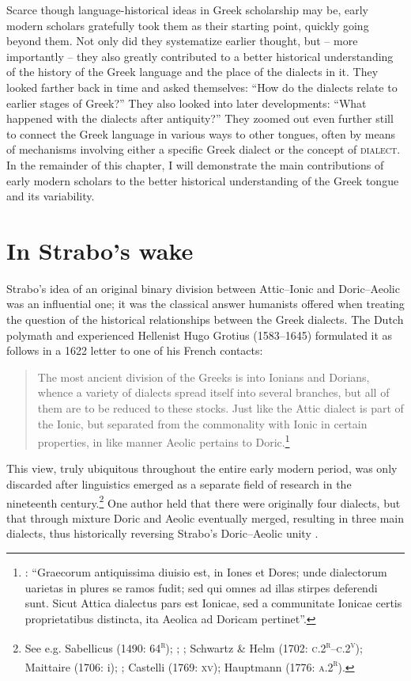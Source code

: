 Scarce though language-historical ideas in Greek scholarship may be, early modern scholars gratefully took them as their starting point, quickly going beyond them. Not only did they systematize earlier thought, but – more importantly – they also greatly contributed to a better historical understanding of the history of the Greek language and the place of the dialects in it. They looked farther back in time and asked themselves: “How do the dialects relate to earlier stages of Greek?” They also looked into later developments: “What happened with the dialects after antiquity?” They zoomed out even further still to connect the Greek language in various ways to other tongues, often by means of mechanisms involving either a specific Greek dialect or the concept of \textsc{dialect}. In the remainder of this chapter, I will demonstrate the main contributions of early modern scholars to the better historical understanding of the Greek tongue and its variability.

\section{In Strabo’s wake}

Strabo’s idea of an original binary division between Attic–Ionic and Doric–Aeolic was an influential one; it was the classical answer humanists offered when treating the question of the historical relationships between the Greek dialects. The Dutch polymath and experienced Hellenist Hugo Grotius (1583–1645) formulated it as follows in a 1622 letter to one of his French contacts:

\begin{quote}
The most ancient division of the Greeks is into Ionians and Dorians, whence a variety of dialects spread itself into several branches, but all of them are to be reduced to these stocks. Just like the Attic dialect is part of the Ionic, but separated from the commonality with Ionic in certain properties, in like manner Aeolic pertains to Doric.\footnote{\citet[143]{Grotius1648}: “Graecorum antiquissima diuisio est, in Iones et Dores; unde dialectorum uarietas in plures se ramos fudit; sed qui omnes ad illas stirpes deferendi sunt. Sicut Attica dialectus pars est Ionicae, sed a communitate Ionicae certis proprietatibus distincta, ita Aeolica ad Doricam pertinet”.}
\end{quote}

This view, truly ubiquitous throughout the entire early modern period, was only discarded after linguistics emerged as a separate field of research in the nineteenth century.\footnote{See e.g. Sabellicus (1490: 64\textsc{\textsuperscript{r}}); \citet[235]{Estienne1573}; \citet[563]{Lancelot1655}; Schwartz \& Helm (1702: \textsc{c.2}\textsc{\textsuperscript{r}}–\textsc{c.2}\textsc{\textsuperscript{v}}); Maittaire (1706: i); \citet[82]{Vitringa1712}; Castelli (1769: \textsc{xv}); Hauptmann (1776: \textsc{a.2}\textsc{\textsuperscript{r}}).} One author held that there were originally four dialects, but that through mixture Doric and Aeolic eventually merged, resulting in three main dialects, thus historically reversing Strabo’s Doric–Aeolic unity \citep[20]{Gedike1782}.

